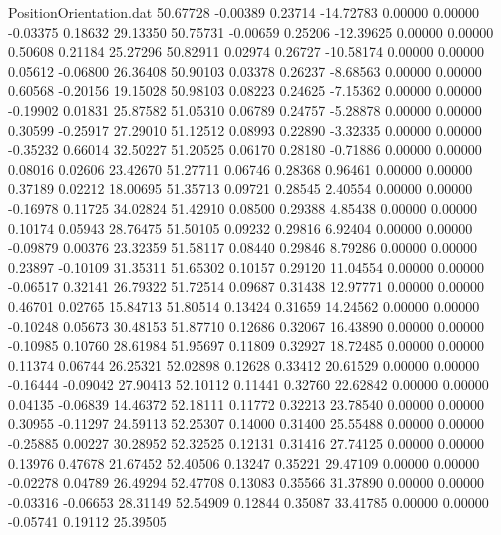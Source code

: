 \begin{filecontents}{PositionOrientation.dat}
  50.67728   -0.00389    0.23714   -14.72783    0.00000    0.00000   -0.03375    0.18632   29.13350
  50.75731   -0.00659    0.25206   -12.39625    0.00000    0.00000    0.50608    0.21184   25.27296
  50.82911    0.02974    0.26727   -10.58174    0.00000    0.00000    0.05612   -0.06800   26.36408
  50.90103    0.03378    0.26237    -8.68563    0.00000    0.00000    0.60568   -0.20156   19.15028
  50.98103    0.08223    0.24625    -7.15362    0.00000    0.00000   -0.19902    0.01831   25.87582
  51.05310    0.06789    0.24757    -5.28878    0.00000    0.00000    0.30599   -0.25917   27.29010
  51.12512    0.08993    0.22890    -3.32335    0.00000    0.00000   -0.35232    0.66014   32.50227
  51.20525    0.06170    0.28180    -0.71886    0.00000    0.00000    0.08016    0.02606   23.42670
  51.27711    0.06746    0.28368     0.96461    0.00000    0.00000    0.37189    0.02212   18.00695
  51.35713    0.09721    0.28545     2.40554    0.00000    0.00000   -0.16978    0.11725   34.02824
  51.42910    0.08500    0.29388     4.85438    0.00000    0.00000    0.10174    0.05943   28.76475
  51.50105    0.09232    0.29816     6.92404    0.00000    0.00000   -0.09879    0.00376   23.32359
  51.58117    0.08440    0.29846     8.79286    0.00000    0.00000    0.23897   -0.10109   31.35311
  51.65302    0.10157    0.29120    11.04554    0.00000    0.00000   -0.06517    0.32141   26.79322
  51.72514    0.09687    0.31438    12.97771    0.00000    0.00000    0.46701    0.02765   15.84713
  51.80514    0.13424    0.31659    14.24562    0.00000    0.00000   -0.10248    0.05673   30.48153
  51.87710    0.12686    0.32067    16.43890    0.00000    0.00000   -0.10985    0.10760   28.61984
  51.95697    0.11809    0.32927    18.72485    0.00000    0.00000    0.11374    0.06744   26.25321
  52.02898    0.12628    0.33412    20.61529    0.00000    0.00000   -0.16444   -0.09042   27.90413
  52.10112    0.11441    0.32760    22.62842    0.00000    0.00000    0.04135   -0.06839   14.46372
  52.18111    0.11772    0.32213    23.78540    0.00000    0.00000    0.30955   -0.11297   24.59113
  52.25307    0.14000    0.31400    25.55488    0.00000    0.00000   -0.25885    0.00227   30.28952
  52.32525    0.12131    0.31416    27.74125    0.00000    0.00000    0.13976    0.47678   21.67452
  52.40506    0.13247    0.35221    29.47109    0.00000    0.00000   -0.02278    0.04789   26.49294
  52.47708    0.13083    0.35566    31.37890    0.00000    0.00000   -0.03316   -0.06653   28.31149
  52.54909    0.12844    0.35087    33.41785    0.00000    0.00000   -0.05741    0.19112   25.39505

\end{filecontents}
